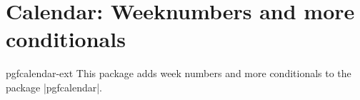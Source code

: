 %
%
%

\section{Calendar: Weeknumbers and more conditionals}
\label{sec:calendar}
\begin{texpackage}{pgfcalendar-ext}
  This package adds week numbers and more conditionals to the \pgfname\space package |pgfcalendar|.
\end{texpackage}


